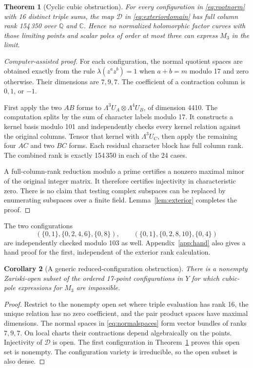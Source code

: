 \documentclass[11pt]{article}
\newtheorem{theorem}{Theorem}[section]
\newtheorem{corollary}[theorem]{Corollary}
\theoremstyle{definition}\newtheorem{definition}[theorem]{Definition}
\theoremstyle{remark}\newtheorem{remark}[theorem]{Remark}
\newcommand{\C}{\mathbb C}
\newcommand{\Q}{\mathbb Q}
\begin{document}
\begin{theorem}[Cyclic cubic obstruction]\label{thm:cyclic}
For every configuration in \eqref{eq:rootnorm} with 16 distinct triple sums,
the map $\mathcal D$ in \eqref{eq:exteriordomain} has full column rank
154\,350 over $\Q$ and $\C$. Hence no normalized holomorphic factor curves
with those limiting points and scalar poles of order at most three can
express $M_3$ in the limit.
\end{theorem}
\begin{proof}[Computer-assisted proof]
For each configuration, the normal quotient spaces are obtained exactly
from the rule $\lambda(z^az^b)=1$ when $a+b=m$ modulo 17 and zero otherwise.
Their dimensions are $7,9,7$. The coefficient of a contraction column is
$0,1$, or $-1$.

First apply the two $AB$ forms to
$\Lambda^3U_A\otimes\Lambda^4U_B$, of dimension 4410. The computation splits
by the sum of character labels modulo 17. It constructs a kernel basis
modulo 101 and independently checks every kernel relation against the
original columns. Tensor that kernel with $\Lambda^3U_C$, then apply the
remaining four $AC$ and two $BC$ forms. Each residual character block has
full column rank. The combined rank is exactly 154\,350 in each of the 24
cases.

A full-column-rank reduction modulo a prime certifies a nonzero maximal
minor of the original integer matrix. It therefore certifies injectivity
in characteristic zero. There is no claim that testing complex subspaces
can be replaced by enumerating subspaces over a finite field.
Lemma~\ref{lem:exterior} completes the proof.
\end{proof}

The two configurations
\[
 (\{0,1\},\{0,2,4,6\},\{0,8\}),\qquad
 (\{0,1\},\{0,2,8,10\},\{0,4\})
\]
are independently checked modulo 103 as well. Appendix~\ref{app:hand}
also gives a hand proof for the first, independent of the exterior rank
calculation.

\begin{corollary}[A generic reduced-configuration obstruction]\label{cor:generic}
There is a nonempty Zariski-open subset of the ordered 17-point configurations
in $Y$ for which cubic-pole expressions for $M_3$ are impossible.
\end{corollary}
\begin{proof}
Restrict to the nonempty open set where triple evaluation has rank 16,
the unique relation has no zero coefficient, and the pair product spaces
have maximal dimensions. The normal spaces in \eqref{eq:normalspaces} form
vector bundles of ranks $7,9,7$. On local charts their contractions depend
algebraically on the points. Injectivity of $\mathcal D$ is open. The first
configuration in Theorem~\ref{thm:cyclic} proves this open set is nonempty.
The configuration variety is irreducible, so the open subset is also dense.
\end{proof}
\end{document}
